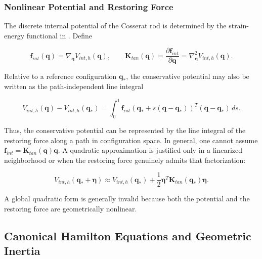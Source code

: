 \subsubsection{Nonlinear Potential and Restoring Force}\label{sec:hamiltonian-3-2-5}

The discrete internal potential of the Cosserat rod is determined by the strain-energy functional in . Define

\begin{equation}
\label{eq:hamiltonian-3-15}
\boxed{\mathbf{f}_{int}\left( \mathbf{q} \right) = \nabla_{\mathbf{q}}V_{int,h}\left( \mathbf{q} \right),\quad\quad\mathbf{K}_{tan}\left( \mathbf{q} \right) = \frac{\partial\mathbf{f}_{int}}{\partial\mathbf{q}} = \nabla_{\mathbf{q}}^{2}V_{int,h}\left( \mathbf{q} \right).}
\end{equation}

Relative to a reference configuration \(\mathbf{q}_{*}\), the conservative potential may also be written as the path-independent line integral

\begin{equation}
\label{eq:hamiltonian-3-16}
V_{int,h}\left( \mathbf{q} \right) - V_{int,h}\left( \mathbf{q}_{*} \right) = \int_{0}^{1}\mathbf{f}_{int}\left( \mathbf{q}_{*} + s\left( \mathbf{q} - \mathbf{q}_{*} \right) \right)^{T}\left( \mathbf{q} - \mathbf{q}_{*} \right)\, ds.
\end{equation}

Thus, the conservative potential can be represented by the line integral of the restoring force along a path in configuration space. In general, one cannot assume \(\mathbf{f}_{int} = \mathbf{K}_{tan}\left( \mathbf{q} \right)\mathbf{q}\). A quadratic approximation is justified only in a linearized neighborhood or when the restoring force genuinely admits that factorization:

\begin{equation}
\label{eq:hamiltonian-3-17}
V_{int,h}\left( \mathbf{q}_{*} + \bm{\eta} \right) \approx V_{int,h}\left( \mathbf{q}_{*} \right) + \frac{1}{2}\bm{\eta}^{T}\mathbf{K}_{tan}\left( \mathbf{q}_{*} \right)\bm{\eta}.
\end{equation}

A global quadratic form is generally invalid because both the potential and the restoring force are geometrically nonlinear.

\subsection{Canonical Hamilton Equations and Geometric Inertia}\label{sec:hamiltonian-3-3}

